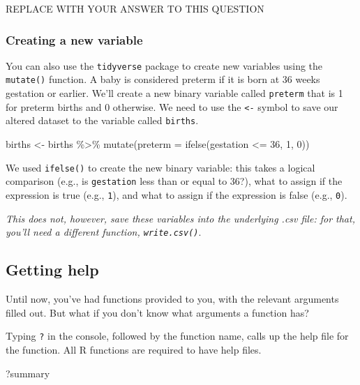 \documentclass[
]{article}
\newenvironment{Shaded}{\begin{snugshade}}{\end{snugshade}}
\newcommand{\AttributeTok}[1]{\textcolor[rgb]{0.77,0.63,0.00}{#1}}
\newcommand{\DecValTok}[1]{\textcolor[rgb]{0.00,0.00,0.81}{#1}}
\newcommand{\FunctionTok}[1]{\textcolor[rgb]{0.00,0.00,0.00}{#1}}
\newcommand{\NormalTok}[1]{#1}
\newcommand{\OtherTok}[1]{\textcolor[rgb]{0.56,0.35,0.01}{#1}}
\newcommand{\SpecialCharTok}[1]{\textcolor[rgb]{0.00,0.00,0.00}{#1}}
\begin{document}
REPLACE WITH YOUR ANSWER TO THIS QUESTION

\hypertarget{creating-a-new-variable}{%
\subsubsection{Creating a new variable}\label{creating-a-new-variable}}

You can also use the \texttt{tidyverse} package to create new variables
using the \texttt{mutate()} function. A baby is considered preterm if it
is born at 36 weeks gestation or earlier. We'll create a new binary
variable called \texttt{preterm} that is 1 for preterm births and 0
otherwise. We need to use the \texttt{\textless{}-} symbol to save our
altered dataset to the variable called \texttt{births}.

\begin{Shaded}
\begin{Highlighting}[]
\NormalTok{births }\OtherTok{\textless{}{-}}\NormalTok{ births }\SpecialCharTok{\%\textgreater{}\%} \FunctionTok{mutate}\NormalTok{(}\AttributeTok{preterm =} \FunctionTok{ifelse}\NormalTok{(gestation }\SpecialCharTok{\textless{}=} \DecValTok{36}\NormalTok{, }\DecValTok{1}\NormalTok{, }\DecValTok{0}\NormalTok{))}
\end{Highlighting}
\end{Shaded}

We used \texttt{ifelse()} to create the new binary variable: this takes
a logical comparison (e.g., is \texttt{gestation} less than or equal to
36?), what to assign if the expression is true (e.g., \texttt{1}), and
what to assign if the expression is false (e.g., \texttt{0}).

\emph{This does not, however, save these variables into the underlying
.csv file: for that, you'll need a different function,
\texttt{write.csv()}}.

\hypertarget{getting-help}{%
\subsection{Getting help}\label{getting-help}}

Until now, you've had functions provided to you, with the relevant
arguments filled out. But what if you don't know what arguments a
function has?

Typing \texttt{?} in the console, followed by the function name, calls
up the help file for the function. All R functions are required to have
help files.

\begin{Shaded}
\begin{Highlighting}[]
\NormalTok{?summary}
\end{Highlighting}
\end{Shaded}
\end{document}
